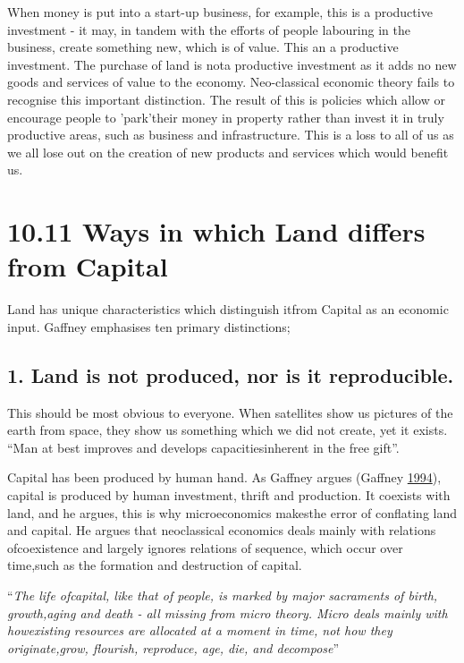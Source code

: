 \documentclass[]{tufte-handout}
\begin{document}
When money is put into a start-up business, for example, this is a
productive investment - it may, in tandem with the efforts of people
labouring in the business, create something new, which is of value. This
an a productive investment. The purchase of land is nota productive
investment as it adds no new goods and services of value to the economy.
Neo-classical economic theory fails to recognise this important
distinction. The result of this is policies which allow or encourage
people to 'park'their money in property rather than invest it in truly
productive areas, such as business and infrastructure. This is a loss to
all of us as we all lose out on the creation of new products and
services which would benefit us.

\hypertarget{ways-in-which-land-differs-from-capital}{%
\section{10.11 Ways in which Land differs from
Capital}\label{ways-in-which-land-differs-from-capital}}

Land has unique characteristics which distinguish itfrom Capital as an
economic input. Gaffney emphasises ten primary distinctions;

\hypertarget{land-is-not-produced-nor-is-it-reproducible.}{%
\subsection{1. Land is not produced, nor is it
reproducible.}\label{land-is-not-produced-nor-is-it-reproducible.}}

This should be most obvious to everyone. When satellites show us
pictures of the earth from space, they show us something which we did
not create, yet it exists. ``Man at best improves and develops
capacitiesinherent in the free gift''.

Capital has been produced by human hand. As Gaffney argues (Gaffney
\protect\hyperlink{ref-Gaffney1994}{1994}), capital is produced by human
investment, thrift and production. It coexists with land, and he argues,
this is why microeconomics makesthe error of conflating land and
capital. He argues that neoclassical economics deals mainly with
relations ofcoexistence and largely ignores relations of sequence, which
occur over time,such as the formation and destruction of capital.

``\emph{The life ofcapital, like that of people, is marked by major
sacraments of birth, growth,aging and death - all missing from micro
theory. Micro deals mainly with howexisting resources are allocated at a
moment in time, not how they originate,grow, flourish, reproduce, age,
die, and decompose}''
\end{document}
